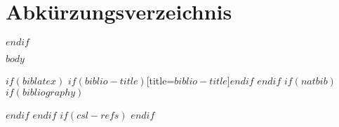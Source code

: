 \documentclass[
    12pt,
    a4paper,
    $if(lang)$
        $babel-lang$,
    $endif$
    bibliography=totocnumbered,
    listof=totocnumbered
]{scrartcl}
\begin{document}
	\section{Abkürzungsverzeichnis}
	\begin{acronym}[OSGi] %
		\setlength{\itemsep}{-\parsep} %
	\end{acronym}
	\newpage
$endif$

\renewcommand{\sectionmark}[1]{\markright{#1}}
\renewcommand{\subsectionmark}[1]{}
\renewcommand{\subsubsectionmark}[1]{}
\rhead{} %

\onehalfspacing
\renewcommand{\thesection}{\arabic{section}}
\renewcommand{\theHsection}{\arabic{section}}
\setcounter{section}{0}
\setcounter{page}{1}

$body$


$if(biblatex)$
	\pagebreak
	\lhead{}
	\renewcommand{\refname}{Quellenverzeichnis}
	\printbibliography$if(biblio-title)$[title=$biblio-title$]$endif$
	\pagebreak
$endif$
$if(natbib)$
  $if(bibliography)$
		\pagebreak
		\lhead{}
		\renewcommand{\refname}{Quellenverzeichnis}
    
 	$endif$
$endif$
$if(csl-refs)$
	\lhead{}
$endif$


\end{document}
